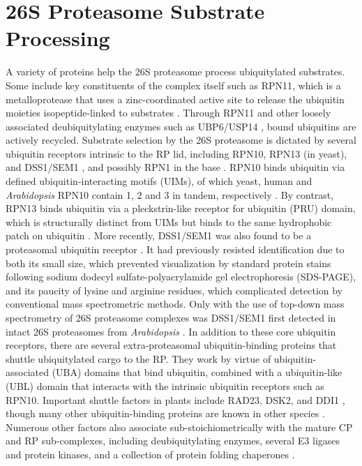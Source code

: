 \section{26S Proteasome Substrate Processing}
	A variety of proteins help the 26S proteasome process ubiquitylated substrates. Some include key constituents of the complex itself such as RPN11, which is a metalloprotease that uses a zinc-coordinated active site to release the ubiquitin moieties isopeptide-linked to substrates \citep{verma02, worden14}.  Through RPN11 and other loosely associated deubiquitylating enzymes such as UBP6/USP14 \citep{hanna06, sakata11}, bound ubiquitins are actively recycled.
	Substrate selection by the 26S proteasome is dictated by several ubiquitin receptors intrinsic to the RP lid, including RPN10, RPN13 (in yeast), and DSS1/SEM1 \citep{fatimababy10, finley09, lin11, paraskevopoulos14, sakata12, van96}, and possibly RPN1 in the base \citep{elsasser02}.  RPN10 binds ubiquitin via defined ubiquitin-interacting motifs (UIMs), of which yeast, human and \textit{Arabidopsis} RPN10 contain 1, 2 and 3 in tandem, respectively \citep{fatimababy10, finley09, fu98, lin11, van96}.  By contrast, RPN13 binds ubiquitin via a pleckstrin-like receptor for ubiquitin (PRU) domain, which is structurally distinct from UIMs but binds to the same hydrophobic patch on ubiquitin \citep{husnjak08, schreiner08}.  More recently, DSS1/SEM1 was also found to be a proteasomal ubiquitin receptor \citep{paraskevopoulos14}.  It had previously resisted identification due to both its small size, which prevented visualization by standard protein stains following sodium dodecyl sulfate-polyacrylamide gel electrophoresis (SDS-PAGE), and its paucity of lysine and arginine residues, which complicated detection by conventional mass spectrometric methods.  Only with the use of top-down mass spectrometry of 26S proteasome complexes was DSS1/SEM1 first detected in intact 26S proteasomes from \textit{Arabidopsis} \citep{russell13}.  
	In addition to these core ubiquitin receptors, there are several extra-proteasomal ubiquitin-binding proteins that shuttle ubiquitylated cargo to the RP.  They work by virtue of ubiquitin-associated (UBA) domains that bind ubiquitin, combined with a ubiquitin-like (UBL) domain that interacts with the intrinsic ubiquitin receptors such as RPN10.  Important shuttle factors in plants include RAD23, DSK2, and DDI1 \citep{farmer10, fatimababy10, finley09, lin11}, though many other ubiquitin-binding proteins are known in other species \citep{husnjak12}.  Numerous other factors also associate sub-stoichiometrically with the mature CP and RP sub-complexes, including deubiquitylating enzymes, several E3 ligases and protein kinases, and a collection of protein folding chaperones \citep{besche14, book10, leggett02, xie00}.


